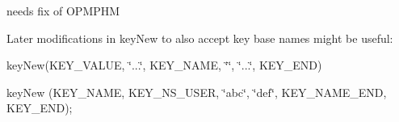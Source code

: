 \begin{DoxyItemize}
\item needs fix of O\+P\+M\+P\+HM
\item Later modifications in key\+New to also accept key base names might be useful\+:
\item key\+New(K\+E\+Y\+\_\+\+V\+A\+L\+UE, \char`\"{}...\char`\"{}, K\+E\+Y\+\_\+\+N\+A\+ME, \char`\"{}\char`\"{}, \char`\"{}...\char`\"{}, K\+E\+Y\+\_\+\+E\+ND)
\item key\+New (K\+E\+Y\+\_\+\+N\+A\+ME, K\+E\+Y\+\_\+\+N\+S\+\_\+\+U\+S\+ER, \char`\"{}abc\char`\"{}, \char`\"{}def\char`\"{}, K\+E\+Y\+\_\+\+N\+A\+M\+E\+\_\+\+E\+ND, K\+E\+Y\+\_\+\+E\+ND);
\end{DoxyItemize}